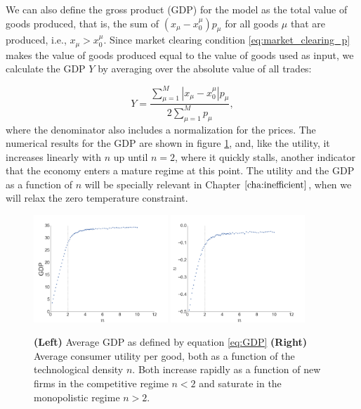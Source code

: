 We can also define the gross product (GDP) for the
model as the total value of goods produced, that is, the sum of
$(x_\mu - x_0^\mu)p_\mu$ for all goods $\mu$ that are produced, i.e.,
$x_\mu > x_0^\mu$. Since market clearing condition
\eqref{eq:market_clearing_p} makes the value of goods produced equal
to the value of goods used as input, we calculate the GDP $Y$ by
averaging over the absolute value of all trades:

\begin{equation}
  \label{eq:GDP}
  Y = \frac{\sum_{\mu = 1}^M |x_\mu - x_0^\mu|p_\mu}{2 \sum_{\mu = 1}^M p_\mu},
\end{equation}
where the denominator also includes a normalization for the prices. The numerical results for the GDP are shown in figure \ref{fig:u_GDP_avg}, and, like the utility, it increases linearly with $n$ up until $n=2$, where it quickly stalls, another indicator that the economy enters a mature regime at this point. The utility and the GDP as a function of $n$ will be specially relevant in Chapter $\ref{cha:inefficient}$, when we will relax the zero temperature constraint.


\begin{figure}[!ht]
  \centering
  \includegraphics[width=0.45\textwidth]{figs_rle/gdp_avg.png}
  \includegraphics[width=0.45\textwidth]{figs_rle/utility_avg.png}
  \caption{\textbf{(Left)} Average GDP as defined by equation \eqref{eq:GDP} \textbf{(Right)} Average consumer utility per good, both as a function of the technological density $n$. Both increase rapidly as a function of new firms in the competitive regime $n < 2$ and saturate in the monopolistic regime $n >2$.}
  \label{fig:u_GDP_avg}
\end{figure}


